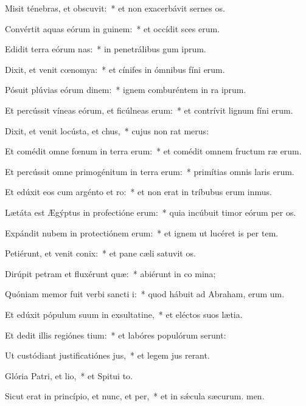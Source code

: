 \item Misit ténebras, et obscuvit:~* et non exacerbávit sernes os.
\item Convértit aquas eórum in guinem:~* et occídit sces erum.
\item Edidit terra eórum nas:~* in penetrálibus gum iprum.
\item Dixit, et venit cœnomya:~* et cínifes in ómnibus fíni erum.
\item Pósuit plúvias eórum dinem:~* ignem comburéntem in ra iprum.
\item Et percússit víneas eórum, et ficúlneas erum:~* et contrívit lignum fíni erum.
\item Dixit, et venit locústa, et chus,~* cujus non rat merus:
\item Et comédit omne fœnum in terra erum:~* et comédit omnem fructum ræ erum.
\item Et percússit omne primogénitum in terra erum:~* primítias omnis laris erum.
\item Et edúxit eos cum argénto et ro:~* et non erat in tríbubus erum inmus.
\item Lætáta est Ægýptus in profectióne erum:~* quia incúbuit timor eórum per os.
\item Expándit nubem in protectiónem erum:~* et ignem ut lucéret is per tem.
\item Petiérunt, et venit conix:~* et pane cæli satuvit os.
\item Dirúpit petram et fluxérunt quæ:~* abiérunt in co mina;
\item Quóniam memor fuit verbi sancti i:~* quod hábuit ad Abraham, erum um.
\item Et edúxit pópulum suum in exsultatine,~* et eléctos suos  lætia.
\item Et dedit illis regiónes tium:~* et labóres populórum serunt:
\item Ut custódiant justificatiónes jus,~* et legem jus rerant.
\item Glória Patri, et lio,~* et Spitui to.
\item Sicut erat in princípio, et nunc, et per,~* et in sǽcula sæcurum. men.
